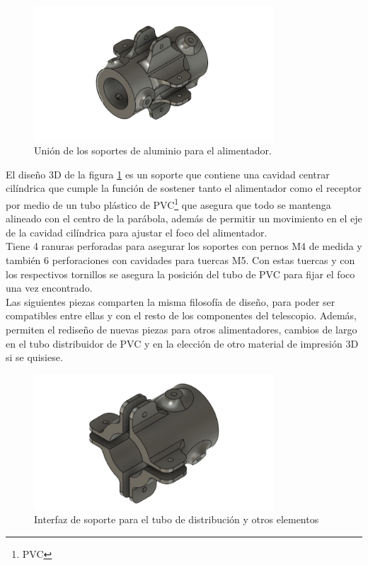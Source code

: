 \begin{figure}
    \centering
    \includegraphics[width=0.8\textwidth]{img/soporte3D5}
    \caption{Unión de los soportes de aluminio para el alimentador.}
    \label{fig:ensamble4}
\end{figure}

El diseño 3D de la figura \ref{fig:ensamble4} es un soporte que contiene una cavidad centrar cilíndrica que cumple la función de sostener tanto el alimentador como el receptor por medio de un tubo plástico de PVC\footnote{PVC} que asegura que todo se mantenga alineado con el centro de la parábola, además de permitir un movimiento en el eje de la cavidad cilíndrica para ajustar el foco del alimentador.\\

Tiene 4 ranuras perforadas para asegurar los soportes con pernos M4 de medida y también 6 perforaciones con cavidades para tuercas M5. Con estas tuercas y con los respectivos tornillos se asegura la posición del tubo de PVC para fijar el foco una vez encontrado.\\

Las siguientes piezas comparten la misma filosofía de diseño, para poder ser compatibles entre ellas y con el resto de los componentes del telescopio. Además, permiten el rediseño de nuevas piezas para otros alimentadores, cambios de largo en el tubo distribuidor de PVC y en la elección de otro material de impresión 3D si se quisiese.\\

\begin{figure}
    \centering
    \includegraphics[width=0.8\textwidth]{img/soporte3D1v1}
    \caption{Interfaz de soporte para el tubo de distribución y otros elementos}
    \label{fig:ensamble5}
\end{figure}

